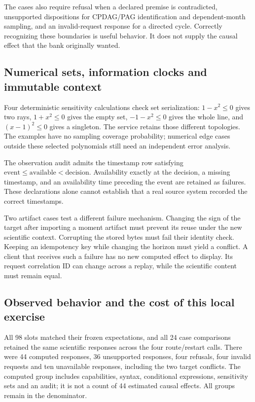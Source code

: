 The cases also require refusal when a declared premise is contradicted,
unsupported dispositions for CPDAG/PAG identification and dependent-month
sampling, and an invalid-request response for a directed cycle. Correctly
recognizing these boundaries is useful behavior. It does not supply the causal
effect that the bank originally wanted.

\subsection{Numerical sets, information clocks and immutable context}

Four deterministic sensitivity calculations check set serialization:
$1-x^2\le0$ gives two rays, $1+x^2\le0$ gives the empty set,
$-1-x^2\le0$ gives the whole line, and $(x-1)^2\le0$ gives a singleton.
The service retains those different topologies. The examples have no sampling
coverage probability; numerical edge cases outside these selected polynomials
still need an independent error analysis.

The observation audit admits the timestamp row satisfying
$\text{event}\le\text{available}<\text{decision}$. Availability exactly at
the decision, a missing timestamp, and an availability time preceding the event
are retained as failures. These declarations alone cannot establish that a
real source system recorded the correct timestamps.

Two artifact cases test a different failure mechanism. Changing the sign of
the target after importing a moment artifact must prevent its reuse under the
new scientific context. Corrupting the stored bytes must fail their identity
check. Keeping an idempotency key while changing the horizon must yield a
conflict. A client that receives such a failure has no new computed effect to
display. Its request correlation ID can change across a replay, while the
scientific content must remain equal.

\subsection{Observed behavior and the cost of this local exercise}

All 98 slots matched their frozen expectations, and all 24 case comparisons
retained the same scientific responses across the four route/restart calls.
There were 44 computed responses, 36 unsupported responses, four refusals,
four invalid requests and ten unavailable responses, including the two target
conflicts. The computed group includes capabilities, syntax, conditional
expressions, sensitivity sets and an audit; it is not a count of 44 estimated
causal effects. All groups remain in the denominator.

